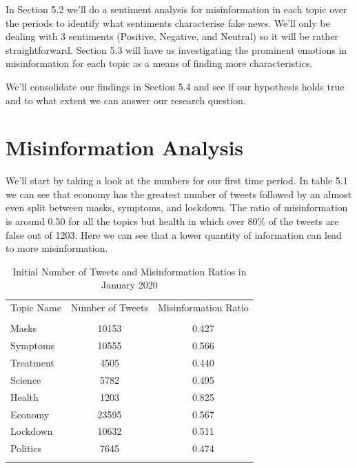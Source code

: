 \documentclass{l4proj}
\begin{document}
In Section 5.2 we'll do a sentiment analysis for misinformation in each topic over the periods to identify what sentiments characterise fake news. We'll only be dealing with 3 sentiments (Positive, Negative, and Neutral) so it will be rather straightforward. Section 5.3 will have us investigating the prominent emotions in misinformation for each topic as a means of finding more characteristics.

We'll consolidate our findings in Section 5.4 and see if our hypothesis holds true and to what extent we can answer our research question.

\section{Misinformation Analysis}
We'll start by taking a look at the numbers for our first time period. In table 5.1 we can see that economy has the greatest number of tweets followed by an almost even split between masks, symptoms, and lockdown. The ratio of misinformation is around 0.50 for all the topics but health in which over 80\% of the tweets are false out of 1203. Here we can see that a lower quantity of information can lead to more misinformation.

\begin{table}[h]
\centering
\begin{tabular}{lcc}
          \multicolumn{1}{l}{Topic Name} & \multicolumn{1}{l}{Number of Tweets} & \multicolumn{1}{l}{Misinformation Ratio} \\
          &                                      &                                          \\
Masks     & 10153                                & 0.427                                    \\
Symptoms  & 10555                                & 0.566                                    \\
Treatment & 4505                                 & 0.440                                    \\
Science   & 5782                                 & 0.495                                    \\
Health    & 1203                                 & 0.825                                    \\
Economy   & 23595                                & 0.567                                    \\
Lockdown  & 10632                                & 0.511                                    \\
Politics  & 7645                                 & 0.474                                    \\
          &                                      &
\end{tabular}
\caption{Initial Number of Tweets and Misinformation Ratios in January 2020}
\label{tab:my-table}
\end{table}
\end{document}
